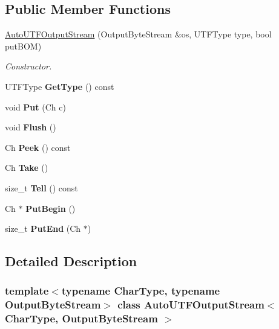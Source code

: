 \subsection*{Public Member Functions}
\begin{DoxyCompactItemize}
\item 
\hyperlink{a02140_a2fe7dbc8e43d11295f66df5653148137}{Auto\+U\+T\+F\+Output\+Stream} (Output\+Byte\+Stream \&os, U\+T\+F\+Type type, bool put\+B\+OM)
\begin{DoxyCompactList}\small\item\em Constructor. \end{DoxyCompactList}\item 
\mbox{\label{a02140_a62091565a8103d69002be2e2f4f0ba2c}} 
U\+T\+F\+Type {\bfseries Get\+Type} () const
\item 
\mbox{\label{a02140_ad12b33e48c45bdbf2628fd3d5461041a}} 
void {\bfseries Put} (Ch c)
\item 
\mbox{\label{a02140_a38b54c84ba0c479552256ac092529f47}} 
void {\bfseries Flush} ()
\item 
\mbox{\label{a02140_ad706f62fd5d22967e5949f3a05087e4e}} 
Ch {\bfseries Peek} () const
\item 
\mbox{\label{a02140_a44ee7d84ba13fece17574d01b7be574b}} 
Ch {\bfseries Take} ()
\item 
\mbox{\label{a02140_a81acbe33d84a28b7d5040d576ae22b5a}} 
size\+\_\+t {\bfseries Tell} () const
\item 
\mbox{\label{a02140_a3c7333661dba3d2210f0b287bdd6c1f3}} 
Ch $\ast$ {\bfseries Put\+Begin} ()
\item 
\mbox{\label{a02140_a4b16bda191526c894501fce447e95b8d}} 
size\+\_\+t {\bfseries Put\+End} (Ch $\ast$)
\end{DoxyCompactItemize}


\subsection{Detailed Description}
\subsubsection*{template$<$typename Char\+Type, typename Output\+Byte\+Stream$>$\newline
class Auto\+U\+T\+F\+Output\+Stream$<$ Char\+Type, Output\+Byte\+Stream $>$}

